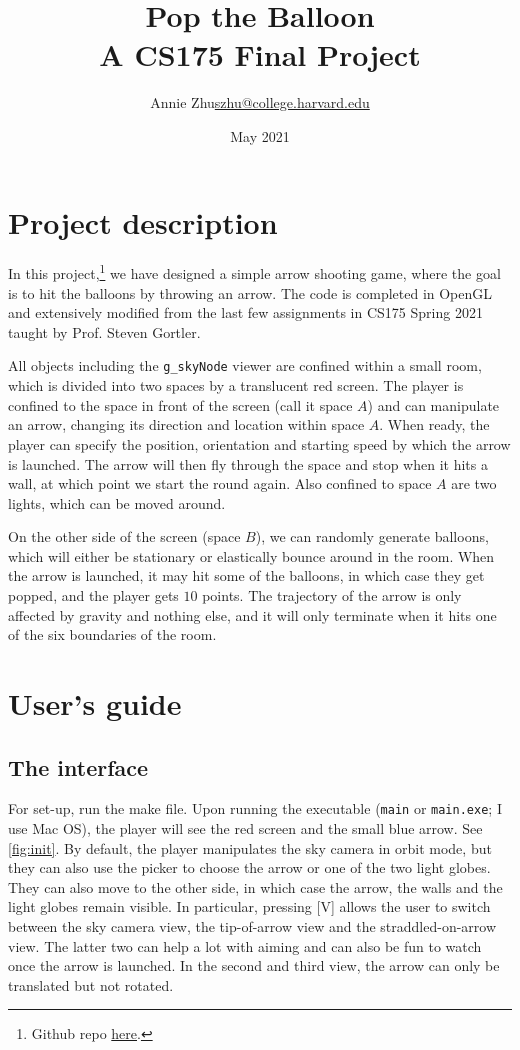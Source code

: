 \documentclass{article}[12pt]
\title{\Large{Pop the Balloon}\medskip\\\large A CS175 Final Project}
\author{Annie Zhu\quad \href{mailto:szhu@college.harvard.edu}{szhu@college.harvard.edu}}
\date{May 2021}
\begin{document}
\maketitle

\section{Project description}

In this project,\footnote{Github repo \href{https://github.com/asyz8/pop-the-balloon/}{\color{blue} here}.} we have designed a simple arrow shooting game, where the goal is to hit the balloons by throwing an arrow. The code is completed in OpenGL and extensively modified from the last few assignments in CS175 Spring 2021 taught by Prof. Steven Gortler.

All objects including the \texttt{g\_skyNode} viewer are confined within a small room, which is divided into two spaces by a translucent red screen. The player is confined to the space in front of the screen (call it space $A$) and can manipulate an arrow, changing its direction and location within space $A$. When ready, the player can specify the position, orientation and starting speed by which the arrow is launched. The arrow will then fly through the space and stop when it hits a wall, at which point we start the round again. Also confined to space $A$ are two lights, which can be moved around. 

On the other side of the screen (space $B$), we can randomly generate balloons, which will either be stationary or elastically bounce around in the room. When the arrow is launched, it may hit some of the balloons, in which case they get popped, and the player gets $10$ points. The trajectory of the arrow is only affected by gravity and nothing else, and it will only terminate when it hits one of the six boundaries of the room. 

\section{User's guide}

\subsection{The interface}
For set-up, run the make file.
Upon running the executable (\texttt{main} or \texttt{main.exe}; I use Mac OS), the player will see the red screen and the small blue arrow. See \cref{fig:init}. By default, the player manipulates the sky camera in orbit mode, but they can also use the picker to choose the arrow or one of the two light globes. They can also move to the other side, in which case the arrow, the walls and the light globes remain visible. In particular, pressing [V] allows the user to switch between the sky camera view, the tip-of-arrow view and the straddled-on-arrow view. The latter two can help a lot with aiming and can also be fun to watch once the arrow is launched. In the second and third view, the arrow can only be translated but not rotated. 
\end{document}
